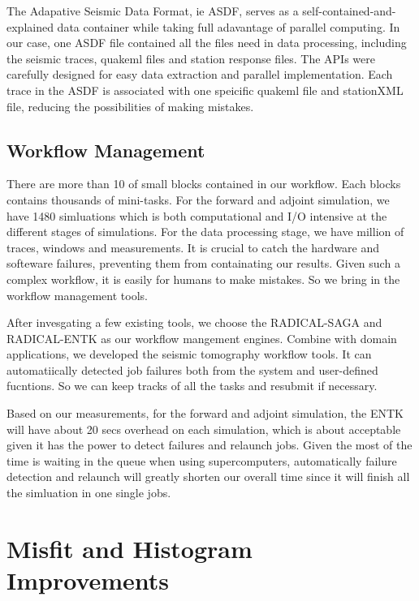\documentclass[extra,mreferee]{gji}
\begin{document}
The Adapative Seismic Data Format, ie ASDF, serves as a self-contained-and-explained data container while taking full adavantage of parallel computing. In our case, one ASDF file contained all the files need in data processing, including the seismic traces, quakeml files and station response files. The APIs were carefully designed for easy data extraction and parallel implementation. Each trace in the ASDF is associated with one speicific quakeml file and stationXML file, reducing the possibilities of making mistakes.

\citep{krischer2016adaptable}

\subsection{Workflow Management}

There are more than 10 of small blocks contained in our workflow. Each blocks contains thousands of mini-tasks. For the forward and adjoint simulation, we have 1480 simluations which is both computational and I/O intensive at the different stages of simulations. For the data processing stage, we have million of traces, windows and measurements. It is crucial to catch the hardware and softeware failures, preventing them from containating our results. Given such a complex workflow, it is easily for humans to make mistakes. So we bring in the workflow management tools.

After invesgating a few existing tools, we choose the RADICAL-SAGA and RADICAL-ENTK as our workflow mangement engines. Combine with domain applications, we developed the seismic tomography workflow tools. It can automatiically detected job failures both from the system and user-defined fucntions. So we can keep tracks of all the tasks and resubmit if necessary.

Based on our measurements, for the forward and adjoint simulation, the ENTK will have about 20 secs overhead on each simulation, which is about acceptable given it has the power to detect failures and relaunch jobs. Given the most of the time is waiting in the queue when using supercomputers, automatically failure detection and relaunch will greatly shorten our overall time since it will finish all the simluation in one single jobs.


\section{Misfit and Histogram Improvements}
\end{document}
